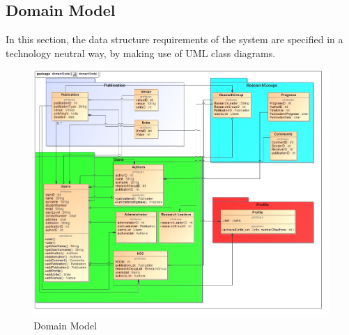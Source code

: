 \documentclass[a4paper,12pt]{article}
\begin{document}
\newpage
\subsection{Domain Model}

In this section, the data structure requirements of the system are specified in a technology neutral way, by making use of UML class diagrams.

\begin{figure}[H]
    \centering
    \caption{Domain Model}
    \includegraphics[width=1\textwidth]{domainModel.jpg}
\end{figure}

\newpage
\end{document}
